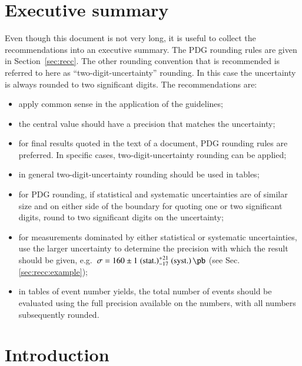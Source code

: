 \documentclass[UKenglish]{latex/atlasdoc}
\author[a]{Halina Abramowicz (Tel Aviv)}
\author[a]{Hans Peter Beck (Bern)}
\author[a]{Ian Brock (Bonn)}
\author[a]{Davide Costanzo (Sheffield)}
\author[a]{Anna Di Ciaccio (Roma II)}
\author[a]{Claudia Gemme (Genova)}
\author[a]{Leonid Gladilin (Lomonosov, MSU)}
\author[a]{Masahiro Kuze (Tokyo)}
\author[a]{George Redlinger (BNL)}
\author[a]{Mike Vetterli (SFU/TRIUMF)}
\author[a]{Rik Yoshida (Argonne)}
\author[a]{Dirk Zerwas (Orsay, LAL)}
\author[a]{Dave Charlton (Birmingham)}
\author[a]{Beate Heinemann (LBL)}
\author[a]{Thorsten Wengler (CERN)}
\author[b]{Carlos Escobar}
\author[c]{Tom Le Compte}
\affil[a]{ATLAS Publications Committee}
\affil[b]{University of Pittsburgh}
\affil[c]{Argonne National Lab.}
\date{\today}
\begin{document}
\section{Executive summary}
\label{sec:summary}

Even though this document is not very long, it is
useful to collect the recommendations into an executive summary.
The PDG rounding rules are given in Section~\ref{sec:recc}. The other
rounding convention that is recommended is referred to here as \enquote{two-digit-uncertainty}
rounding. In this case the uncertainty is always rounded to two
significant digits. The recommendations are:
\begin{itemize}
\item apply common sense in the application of the guidelines;
\item the central value should have a precision that
  matches the uncertainty;
\item for final results quoted in the text of a document, PDG rounding
  rules are preferred. In specific cases, two-digit-uncertainty
  rounding can be applied;
\item in general two-digit-uncertainty rounding should be used in
  tables;
\item for PDG rounding, if statistical and systematic uncertainties are of
similar size and on either side of the boundary for quoting one or two
significant digits, round to two significant digits on the uncertainty;
\item for measurements dominated by either statistical or systematic
  uncertainties, use the larger uncertainty to determine the precision
  with which the result should be given, e.g.\ $\sigma = 160 \pm
  1\stat ^{+21}_{-17}\syst\,\si{\pb}$ (see Sec.\ref{sec:recc:example});
\item in tables of event number yields, the total number of events
  should be evaluated using the full precision available on the numbers,
with all numbers subsequently rounded.
 \end{itemize}


\section{Introduction}
\label{sec:intro}
\end{document}
